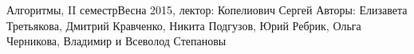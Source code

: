 


\BigHeader
    {Алгоритмы, II семестр}{Весна 2015, лектор: Копелиович Сергей}
    {Авторы: Елизавета Третьякова, Дмитрий Кравченко, Никита Подгузов, Юрий Ребрик, Ольга Черникова, Владимир и Всеволод Степановы}












